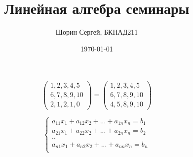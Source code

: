 \documentclass[a4paper]{article}
\author{Шорин Сергей, БКНАД211}
\title{Линейная алгебра семинары}
\date{\today}
\begin{document}
\maketitle

\newpage

\section{}










\begin{equation*}
\begin{pmatrix}
  1, 2, 3, 4, 5 \\
  6, 7, 8, 9, 10\\
  2, 1, 2, 1, 0
\end{pmatrix} = 
\begin{pmatrix}
  1, 2, 3, 4, 5\\
  6, 7, 8, 9, 10\\
  4, 5, 8, 9, 10
\end{pmatrix}
\end{equation*}

\begin{equation*}
 \begin{cases}
 a_{11}x_1 + a_{12}x_2 + ... + a_{1n}x_n = b_1 \\
 a_{21}x_1 + a_{22}x_2 + ... + a_{2n}x_n = b_2 \\
   ..\\
   a_{n1}x_1 + a_{n2}x_2 + ... + a_{nn}x_n = b_n \\
 \end{cases}
\end{equation*}
\end{document}

